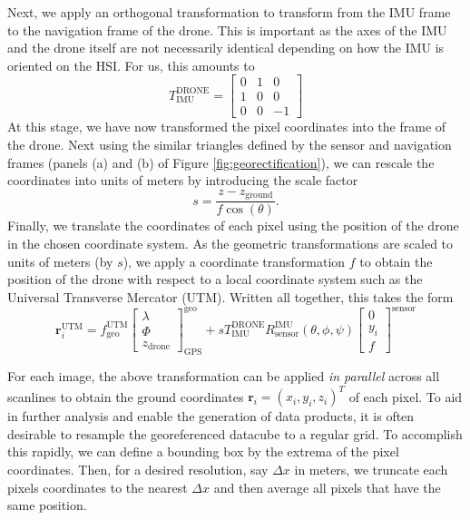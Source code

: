 Next, we apply an orthogonal transformation to transform from the IMU frame to the navigation frame of the drone. This is important as the axes of the IMU and the drone itself are not necessarily identical depending on how the IMU is oriented on the HSI. For us, this amounts to
\begin{equation}
  T_{\text{IMU}}^{\text{DRONE}} = \begin{bmatrix}
    0 & 1 & 0 \\
    1 & 0 & 0 \\
    0 & 0 & -1
    \end{bmatrix}
\end{equation}
At this stage, we have now transformed the pixel coordinates into the frame of the drone. Next using the similar triangles defined by the sensor and navigation frames (panels (a) and (b) of Figure \ref{fig:georectification}), we can rescale the coordinates into units of meters by introducing the scale factor
\begin{equation}
  s = \frac{z-z_{\text{ground}}}{f\cos(\theta)}.
\end{equation}
Finally, we translate the coordinates of each pixel using the position of the drone in the chosen coordinate system. As the geometric transformations are scaled to units of meters (by $s$), we apply a coordinate transformation $f$ to obtain the position of the drone with respect to a local coordinate system such as the Universal Transverse Mercator (UTM). Written all together, this takes the form
\begin{equation}
  \mathbf{r}_{i}^{\text{UTM}} =
  f_{\text{geo}}^{\text{UTM}}\begin{bmatrix}
    \lambda \\
    \Phi \\
    z_{\text{drone}}
  \end{bmatrix}_{\text{GPS}}^{\text{geo}} + sT_{\text{IMU}}^{\text{DRONE}}R_{\text{sensor}}^{\text{IMU}}(\theta, \phi, \psi)\begin{bmatrix}
    0 \\
    y_i \\
    f
  \end{bmatrix}^{\text{sensor}}
\end{equation}

For each image, the above transformation can be applied \textit{in parallel} across all scanlines to obtain the ground coordinates $\mathbf{r}_i=(x_i, y_i,z_i)^T$ of each pixel. To aid in further analysis and enable the generation of data products, it is often desirable to resample the georeferenced datacube to a regular grid. To accomplish this rapidly, we can define a bounding box by the extrema of the pixel coordinates. Then, for a desired resolution, say $\Delta x$ in meters, we truncate each pixels coordinates to the nearest $\Delta x$ and then average all pixels that have the same position.


